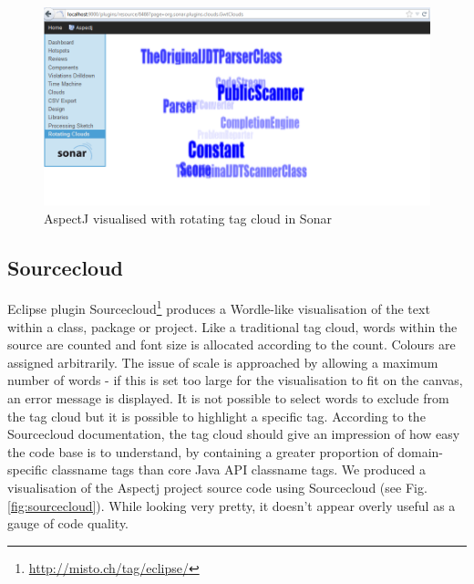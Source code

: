 \begin{figure}[h!]
   \centering
   \includegraphics[width=140mm]{sonarrotatingcloud.png}
  \caption{AspectJ visualised with rotating tag cloud in Sonar}
  \label{fig:aspectjtagcanvas}
\end{figure}

\subsection{Sourcecloud}

Eclipse plugin Sourcecloud\footnote{\url{http://misto.ch/tag/eclipse/}} produces a Wordle-like visualisation of the text within a class, package or project. Like a traditional tag cloud, words within the source are counted and font size is allocated according to the count. Colours are assigned arbitrarily. The issue of scale is approached by allowing a maximum number of words - if this is set too large for the visualisation to fit on the canvas, an error message is displayed. It is not possible to select words to exclude from the tag cloud but it is possible to highlight a specific tag. According to the Sourcecloud documentation, the tag cloud should give an impression of how easy the code base is to understand, by containing a greater proportion of domain-specific classname tags than core Java API classname tags. We produced a visualisation of the Aspectj project source code using Sourcecloud (see Fig. \ref{fig:sourcecloud}). While looking very pretty, it doesn't appear overly useful as a gauge of code quality.

